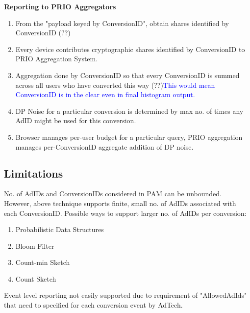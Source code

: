 \textbf{Reporting to PRIO Aggregators}
\begin{enumerate}
    \item From the "payload keyed by ConversionID", obtain shares identified by ConversionID (??)
    \item Every device contributes cryptographic shares identified by ConversionID to PRIO Aggregation System.
    \item Aggregation done by ConversionID so that every ConversionID is summed across all users who have converted this way (??)\textcolor{blue}{This would mean ConversionID is in the clear even in final histogram output.}
    \item DP Noise for a particular conversion is determined by max no. of times any AdID might be used for this conversion.    \item Browser manages per-user budget for a particular query, PRIO aggregation manages per-ConversionID aggregate addition of DP noise.
\end{enumerate}

\subsection{Limitations}
No. of AdIDs and ConversionIDs considered in PAM can be unbounded. However, above technique supports finite, small no. of AdIDs associated with each ConversionID. Possible ways to support larger no. of AdIDs per conversion:
\begin{enumerate}
    \item Probabilistic Data Structures
    \item Bloom Filter
    \item Count-min Sketch
    \item Count Sketch
\end{enumerate}

Event level reporting not easily supported due to requirement of "AllowedAdIds" that need to specified for each conversion event by AdTech.



%
